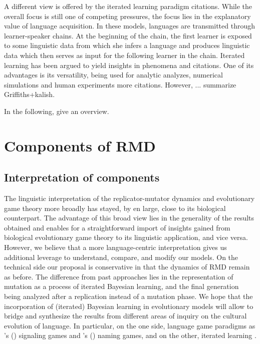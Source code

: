 \documentclass[12pt]{article}
\newcommand{\citeposs}[2][]{\citeauthor{#2}'s (\citeyear[#1]{#2})}
\newcommand{\hloranj}[1]{\textcolor[rgb]{.8,.33,.0}{#1}}%
\begin{document}
A different view is offered by the iterated learning paradigm \hloranj{citations}. While the overall focus is still one of competing pressures, the focus lies in the explanatory value of language acquisition. In these models, languages are transmitted through learner-speaker chains. At the beginning of the chain, the first learner is exposed to some linguistic data from which she infers a language and produces linguistic data which then serves as input for the following learner in the chain. Iterated learning has been argued to yield insights in \hloranj{phenomena and citations}. One of its advantages is its versatility, being used for analytic analyzes, numerical simulations and human experiments \hloranj{more citations}. However, ... summarize \hloranj{Griffiths+kalish}.

In the following, \hloranj{give an overview}.




\section{Components of RMD}

\subsection{Interpretation of components}

The linguistic interpretation of the replicator-mutator dynamics and evolutionary game theory more broadly has stayed, by en large, close to its biological counterpart. The advantage of this broad view lies in the generality of the results obtained and enables for a straightforward import of insights gained from biological evolutionary game theory to its linguistic application, and vice versa. However, we believe that a more language-centric interpretation gives us additional leverage to understand, compare, and modify our models. On the technical side our proposal is conservative in that the dynamics of RMD remain as before. The difference from past approaches lies in the representation of mutation as a process of iterated Bayesian learning, and the final generation being analyzed after a replication instead of a mutation phase. We hope that the incorporation of (iterated) Bayesian learning in evolutionary models will allow to bridge and synthesize the results from different areas of inquiry on the cultural evolution of language. In particular, on the one side, language game paradigms as \citeposs{lewis:1969} signaling games and \citeposs{steels:2012} naming games, and on the other, iterated learning \citep{kirby:2001}.
\end{document}
